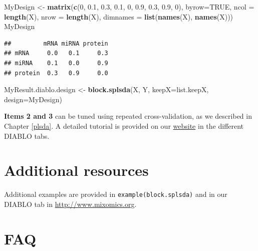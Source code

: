 \documentclass[]{book}
\newenvironment{Shaded}{\begin{snugshade}}{\end{snugshade}}
\newcommand{\KeywordTok}[1]{\textcolor[rgb]{0.13,0.29,0.53}{\textbf{#1}}}
\newcommand{\DataTypeTok}[1]{\textcolor[rgb]{0.13,0.29,0.53}{#1}}
\newcommand{\DecValTok}[1]{\textcolor[rgb]{0.00,0.00,0.81}{#1}}
\newcommand{\FloatTok}[1]{\textcolor[rgb]{0.00,0.00,0.81}{#1}}
\newcommand{\StringTok}[1]{\textcolor[rgb]{0.31,0.60,0.02}{#1}}
\newcommand{\OtherTok}[1]{\textcolor[rgb]{0.56,0.35,0.01}{#1}}
\newcommand{\NormalTok}[1]{#1}
\theoremstyle{definition}
\theoremstyle{definition}
\theoremstyle{definition}
\theoremstyle{remark}
\begin{document}
\begin{Shaded}
\begin{Highlighting}[]
\NormalTok{MyDesign <-}\StringTok{ }\KeywordTok{matrix}\NormalTok{(}\KeywordTok{c}\NormalTok{(}\DecValTok{0}\NormalTok{, }\FloatTok{0.1}\NormalTok{, }\FloatTok{0.3}\NormalTok{,}
                     \FloatTok{0.1}\NormalTok{, }\DecValTok{0}\NormalTok{, }\FloatTok{0.9}\NormalTok{,}
                     \FloatTok{0.3}\NormalTok{, }\FloatTok{0.9}\NormalTok{, }\DecValTok{0}\NormalTok{),}
                   \DataTypeTok{byrow=}\OtherTok{TRUE}\NormalTok{,}
                   \DataTypeTok{ncol =} \KeywordTok{length}\NormalTok{(X), }\DataTypeTok{nrow =} \KeywordTok{length}\NormalTok{(X),}
                 \DataTypeTok{dimnames =} \KeywordTok{list}\NormalTok{(}\KeywordTok{names}\NormalTok{(X), }\KeywordTok{names}\NormalTok{(X)))}
\NormalTok{MyDesign}
\end{Highlighting}
\end{Shaded}

\begin{verbatim}
##         mRNA miRNA protein
## mRNA     0.0   0.1     0.3
## miRNA    0.1   0.0     0.9
## protein  0.3   0.9     0.0
\end{verbatim}

\begin{Shaded}
\begin{Highlighting}[]
\NormalTok{MyResult.diablo.design <-}\StringTok{ }\KeywordTok{block.splsda}\NormalTok{(X, Y, }\DataTypeTok{keepX=}\NormalTok{list.keepX, }\DataTypeTok{design=}\NormalTok{MyDesign)}
\end{Highlighting}
\end{Shaded}

\textbf{Items 2 and 3} can be tuned using repeated cross-validation, as
we described in Chapter \ref{plsda}. A detailed tutorial is provided on
our \href{http://mixomics.org/mixdiablo/}{website} in the different
DIABLO tabs.

\section{Additional resources}\label{additional-resources-3}

Additional examples are provided in \texttt{example(block.splsda)} and
in our DIABLO tab in \url{http://www.mixomics.org}.

\section{FAQ}\label{faq-3}
\end{document}
